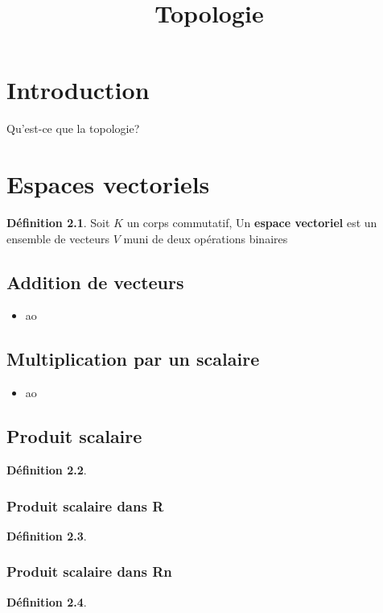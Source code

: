 \documentclass[12pt]{book}
\title{Topologie}
\newcommand\todo[1]{\phantom{#1}}
\theoremstyle{definition}
\newtheorem{definition}{Définition}[section]
\begin{document}
\chapter{Introduction}
Qu'est-ce que la topologie?


\chapter{Espaces vectoriels}
\todo{Complete}
\begin{definition}
    \label{def:espace_vectoriel} 
    Soit $K$ un corps commutatif, Un \textbf{espace vectoriel} est un ensemble de vecteurs $V$ muni de deux opérations binaires
\end{definition}

\section{Addition de vecteurs}
\begin{itemize}
    \item ao
\end{itemize}

\section{Multiplication par un scalaire}
\begin{itemize}
    \item ao
\end{itemize}

\section{Produit scalaire}
\begin{definition}
    \label{def:produit_scalaire}
\end{definition}
\subsection{Produit scalaire dans R}
\begin{definition}
    \label{def:produit_scalaire_r}
\end{definition}
\subsection{Produit scalaire dans Rn}
\begin{definition}
    \label{def:produit_scalaire_rn}
\end{definition}
\end{document}
